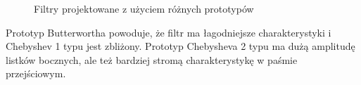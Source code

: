 \documentclass[12pt,titlepage]{report}
\begin{document}
\begin{figure}[!h]
	\centering
	\par
	\caption{Filtry projektowane z użyciem różnych prototypów}
\end{figure}
Prototyp Butterwortha powoduje, że filtr ma łagodniejsze charakterystyki i Chebyshev 1 typu jest zbliżony. Prototyp Chebysheva 2 typu ma dużą amplitudę listków bocznych, ale też bardziej stromą charakterystykę w paśmie przejściowym.
\newpage
\end{document}
